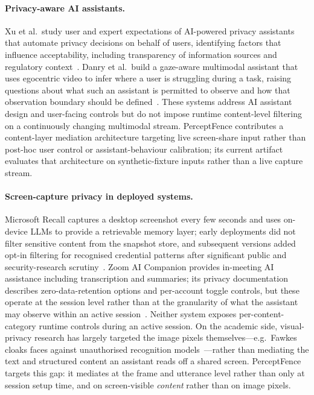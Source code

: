 \documentclass[pdflatex,sn-mathphys-num]{sn-jnl}
\begin{document}
\paragraph{Privacy-aware AI assistants.}
Xu et al.\ study user and expert expectations of AI-powered privacy assistants
that automate privacy decisions on behalf of users, identifying factors that
influence acceptability, including transparency of information sources and
regulatory context~\cite{xu2025acceptability}.
Danry et al.\ build a gaze-aware multimodal assistant that uses egocentric video
to infer where a user is struggling during a task, raising questions about what
such an assistant is permitted to observe and how that observation boundary
should be defined~\cite{danry2026gaze}.
These systems address AI assistant design and user-facing controls but do not
impose runtime content-level filtering on a continuously changing multimodal
stream.
PerceptFence contributes a content-layer mediation architecture targeting live
screen-share input rather than post-hoc user control or assistant-behaviour
calibration; its current artifact evaluates that architecture on
synthetic-fixture inputs rather than a live capture stream.

\paragraph{Screen-capture privacy in deployed systems.}
Microsoft Recall captures a desktop screenshot every few seconds and uses
on-device LLMs to provide a retrievable memory layer; early deployments did not
filter sensitive content from the snapshot store, and subsequent versions added
opt-in filtering for recognised credential patterns after significant public and
security-research scrutiny~\cite{microsoft2024recall}.
Zoom AI Companion provides in-meeting AI assistance including transcription and
summaries; its privacy documentation describes zero-data-retention options and
per-account toggle controls, but these operate at the session level rather than
at the granularity of what the assistant may observe within an active
session~\cite{zoom2024ai}.
Neither system exposes per-content-category runtime controls during an active
session.
On the academic side, visual-privacy research has largely targeted the image
pixels themselves---e.g.\ Fawkes cloaks faces against unauthorised recognition
models~\cite{shan2020fawkes}---rather than mediating the text and structured
content an assistant reads off a shared screen.
PerceptFence targets this gap: it mediates at the frame and utterance level
rather than only at session setup time, and on screen-visible \textit{content}
rather than on image pixels.
\end{document}
